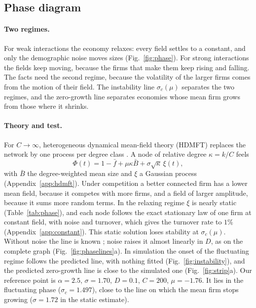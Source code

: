 \documentclass[pre,twocolumn,superscriptaddress,nofootinbib]{revtex4-2}
\begin{document}
\subsection{Phase diagram}
\label{sec:phase}

\paragraph{Two regimes.}  For weak interactions the economy relaxes: every field settles to a constant, and only
the demographic noise moves sizes (Fig.~\ref{fig:phase}).  For strong interactions the fields keep moving, because
the firms that make them keep rising and falling.  The facts need the second regime, because the volatility of the
larger firms comes from the motion of their field.  The instability line $\sigma_c(\mu)$ separates the two
regimes, and the zero-growth line separates economies whose mean firm grows from those where it shrinks.

\paragraph{Theory and test.}  For $C\to\infty$, heterogeneous dynamical mean-field theory (HDMFT) replaces the
network by one process per degree class \cite{aguirrelopez,park2024,poley2025,patil2026}.  A node of relative
degree $\kappa=k/C$ feels
\begin{equation}
\Phi(t)=1-\bar f+\mu\kappa\bar B+\sigma\sqrt\kappa\,\xi(t),
\label{eq:hdmft}
\end{equation}
with $\bar B$ the degree-weighted mean size and $\xi$ a Gaussian process (Appendix~\ref{app:hdmft}).  Under
competition a better connected firm has a lower mean field, because it competes with more firms, and a field of
larger amplitude, because it sums more random terms.  In the relaxing regime $\xi$ is nearly static
(Table~\ref{tab:phase}), and each node follows the exact stationary law of one firm at constant field, with noise
and turnover, which gives the turnover rate to $1\%$ (Appendix~\ref{app:constant}).  This static solution loses stability at $\sigma_c(\mu)$.  Without
noise the line is known \cite{aguirrelopez,poley2025,patil2026}; noise raises it almost linearly in $D$, as on the
complete graph \cite{altieri2021} (Fig.~\ref{fig:phaselines}a).  In simulation the onset of the fluctuating regime follows the predicted line,
with nothing fitted (Fig.~\ref{fig:instability}), and the predicted zero-growth line is close to the simulated one
(Fig.~\ref{fig:strip}a).  Our reference point is $\alpha=2.5$, $\sigma=1.70$, $D=0.1$, $C=200$, $\mu=-1.76$.  It
lies in the fluctuating phase ($\sigma_c=1.497$), close to the line on which the mean firm stops growing
($\sigma=1.72$ in the static estimate).
\end{document}
